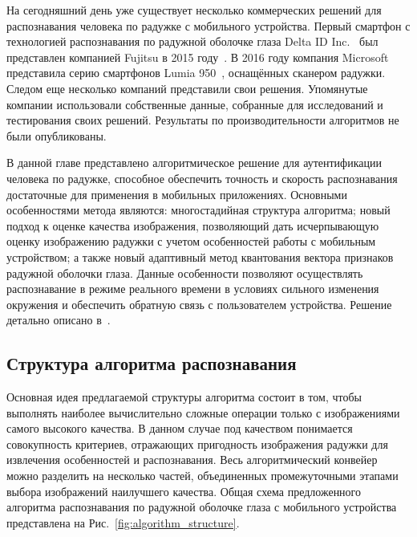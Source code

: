 На сегодняшний день уже существует несколько коммерческих решений для распознавания человека по радужке с мобильного устройства. Первый смартфон с технологией распознавания по радужной оболочке глаза Delta ID Inc.~\cite{deltaId,deltaId_ref} был представлен компанией Fujitsu в 2015 году~\cite{fujitsu}. В 2016 году компания Microsoft представила серию смартфонов Lumia 950~\cite{lumia_950}, оснащённых сканером радужки. Следом еще несколько компаний представили свои решения. Упомянутые компании использовали собственные данные, собранные для исследований и тестирования своих решений. Результаты по производительности алгоритмов не были опубликованы.

В данной главе представлено алгоритмическое решение для аутентификации человека по радужке, способное обеспечить точность и скорость распознавания достаточные для применения в мобильных приложениях. Основными особенностями метода являются: многостадийная структура алгоритма; новый подход к оценке качества изображения, позволяющий дать исчерпывающую оценку изображению радужки с учетом особенностей работы с мобильным устройством; а также новый адаптивный метод квантования вектора признаков радужной оболочки глаза. Данные особенности позволяют осуществлять распознавание в режиме реального времени в условиях сильного изменения окружения и обеспечить обратную связь с пользователем устройства. Решение детально описано в~\cite{odinokikh_hprec_2018}.

\subsection{Структура алгоритма распознавания}
\label{subsec:algorithm_structure}

Основная идея предлагаемой структуры алгоритма состоит в том, чтобы выполнять наиболее вычислительно сложные операции только с изображениями самого высокого качества. В данном случае под качеством понимается совокупность критериев, отражающих пригодность изображения радужки для извлечения особенностей и распознавания. Весь алгоритмический конвейер можно разделить на несколько частей, объединенных промежуточными этапами выбора изображений наилучшего качества. Общая схема предложенного алгоритма распознавания по радужной оболочке глаза с мобильного устройства представлена на Рис.~\ref{fig:algorithm_structure}.

